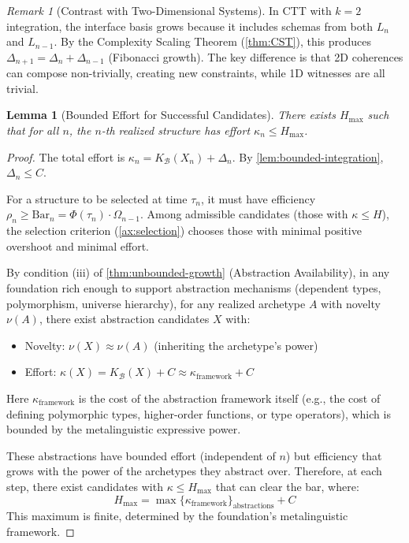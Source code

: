 \documentclass[11pt]{article}
\newtheorem{lemma}[theorem]{Lemma}
\theoremstyle{definition}
\theoremstyle{remark}
\newtheorem{remark}[theorem]{Remark}
\begin{document}
\begin{remark}[Contrast with Two-Dimensional Systems]
In CTT with $k = 2$ integration, the interface basis grows because it includes schemas from both $L_n$ and $L_{n-1}$. By the Complexity Scaling Theorem (\cref{thm:CST}), this produces $\Delta_{n+1} = \Delta_n + \Delta_{n-1}$ (Fibonacci growth). The key difference is that 2D coherences can compose non-trivially, creating new constraints, while 1D witnesses are all trivial.
\end{remark}

\begin{lemma}[Bounded Effort for Successful Candidates]
\label{lem:bounded-effort}
There exists $H_{\max}$ such that for all $n$, the $n$-th realized structure has effort $\kappa_n \leq H_{\max}$.
\end{lemma}

\begin{proof}
The total effort is $\kappa_n = K_{\mathcal{B}}(X_n) + \Delta_n$. By \cref{lem:bounded-integration}, $\Delta_n \leq C$.

For a structure to be selected at time $\tau_n$, it must have efficiency $\rho_n \geq \mathrm{Bar}_n = \Phi(\tau_n) \cdot \Omega_{n-1}$. Among admissible candidates (those with $\kappa \leq H$), the selection criterion (\cref{ax:selection}) chooses those with minimal positive overshoot and minimal effort.

By condition (iii) of \cref{thm:unbounded-growth} (Abstraction Availability), in any foundation rich enough to support abstraction mechanisms (dependent types, polymorphism, universe hierarchy), for any realized archetype $A$ with novelty $\nu(A)$, there exist abstraction candidates $X$ with:
\begin{itemize}
\item Novelty: $\nu(X) \approx \nu(A)$ (inheriting the archetype's power)
\item Effort: $\kappa(X) = K_{\mathcal{B}}(X) + C \approx \kappa_{\text{framework}} + C$
\end{itemize}

Here $\kappa_{\text{framework}}$ is the cost of the abstraction framework itself (e.g., the cost of defining polymorphic types, higher-order functions, or type operators), which is bounded by the metalinguistic expressive power.

These abstractions have bounded effort (independent of $n$) but efficiency that grows with the power of the archetypes they abstract over. Therefore, at each step, there exist candidates with $\kappa \leq H_{\max}$ that can clear the bar, where:
\[
H_{\max} = \max\{\kappa_{\text{framework}}\}_{\text{abstractions}} + C
\]
This maximum is finite, determined by the foundation's metalinguistic framework.
\end{proof}
\end{document}
